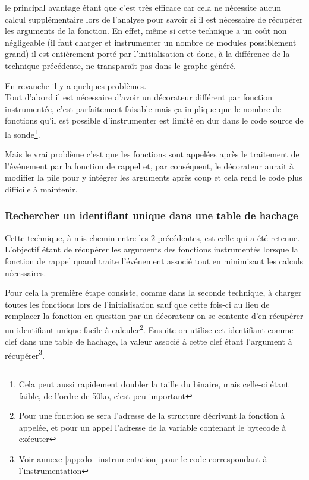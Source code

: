 le principal avantage étant que c'est très efficace car cela ne nécessite aucun calcul supplémentaire lors de l'analyse pour savoir si il est nécessaire de récupérer les arguments de la fonction. En effet, même si cette technique a un coût non négligeable (il faut charger et instrumenter un nombre de modules possiblement grand) il est entièrement porté par l'initialisation et donc, à la différence de la technique précédente, ne transparaît pas dans le graphe généré.

En revanche il y a quelques problèmes. \\
Tout d'abord il est nécessaire d'avoir un décorateur différent par fonction instrumentée, c'est parfaitement faisable mais ça implique que le nombre de fonctions qu'il est possible d'instrumenter est limité en dur dans le code source de la sonde\footnote{Cela peut aussi rapidement doubler la taille du binaire, mais celle-ci étant faible, de l'ordre de 50ko, c'est peu important}.
 
Mais le vrai problème c'est que les fonctions sont appelées après le traitement de l'événement par la fonction de rappel et, par conséquent, le décorateur aurait à modifier la pile pour y intégrer les arguments après coup et cela rend le code plus difficile à maintenir.

\subsubsection*{Rechercher un identifiant unique dans une table de hachage}
Cette technique, à mis chemin entre les 2 précédentes, est celle qui a été retenue. L'objectif étant de récupérer les arguments des fonctions instrumentés lorsque la fonction de rappel quand traite l'événement associé tout en minimisant les calculs nécessaires.

Pour cela la première étape consiste, comme dans la seconde technique, à charger toutes les fonctions lors de l’initialisation sauf que cette fois-ci au lieu de remplacer la fonction en question par un décorateur on se contente d'en récupérer un identifiant unique facile à calculer\footnote{Pour une fonction \C se sera l'adresse de la structure décrivant la fonction \C à appelée, et pour un appel \Python l'adresse de la variable contenant le bytecode à exécuter}. Ensuite on utilise cet identifiant comme clef dans une table de hachage, la valeur associé à cette clef étant l'argument à récupérer\footnote{Voir annexe \vref{app:do_instrumentation} pour le code correspondant à l'instrumentation}.

